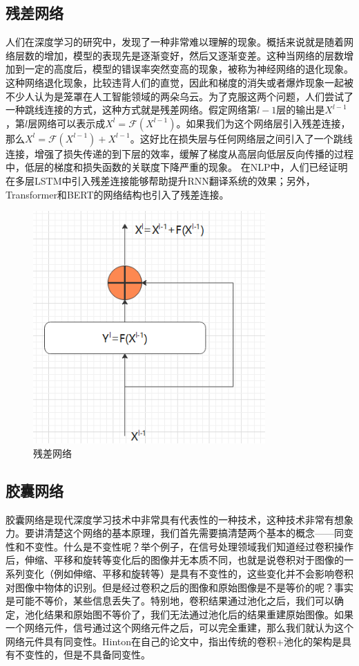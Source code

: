 \documentclass[twoside,a4paper,12pt]{book}%
\begin{document}
\subsection{残差网络}
人们在深度学习的研究中，发现了一种非常难以理解的现象。概括来说就是随着网络层数的增加，模型的表现先是逐渐变好，然后又逐渐变差。这种当网络的层数增加到一定的高度后，模型的错误率突然变高的现象，被称为神经网络的退化现象。这种网络退化现象，比较违背人们的直觉，因此和梯度的消失或者爆炸现象一起被不少人认为是笼罩在人工智能领域的两朵乌云。为了克服这两个问题，人们尝试了一种跳线连接的方式，这种方式就是残差网络。假定网络第$l-1$层的输出是$X^{l-1}$，第$l$层网络可以表示成$X^l=\mathcal{F}(X^{l-1})$。如果我们为这个网络层引入残差连接，那么$X^l=\mathcal{F}(X^{l-1})+X^{l-1}$。这好比在损失层与任何网络层之间引入了一个跳线连接，增强了损失传递的到下层的效率，缓解了梯度从高层向低层反向传播的过程中，低层的梯度和损失函数的关联度下降严重的现象。
在\gls{NLP}中，人们已经证明在多层\gls{LSTM}中引入残差连接能够帮助提升\gls{RNN}翻译系统的效果；另外，Transformer和\gls{BERT}的网络结构也引入了残差连接。
\begin{figure}[ht]
\begin{center}
\includegraphics[width=3.5in]{figures/resnet.png}
\caption{残差网络}
\label{fig:resnet}
\end{center}
\end{figure}

\subsection{胶囊网络}
胶囊网络是现代深度学习技术中非常具有代表性的一种技术，这种技术非常有想象力。要讲清楚这个网络的基本原理，我们首先需要搞清楚两个基本的概念——同变性和不变性。什么是不变性呢？举个例子，在信号处理领域我们知道经过卷积操作后，伸缩、平移和旋转等变化后的图像并无本质不同，也就是说卷积对于图像的一系列变化（例如伸缩、平移和旋转等）是具有不变性的，这些变化并不会影响卷积对图像中物体的识别。但是经过卷积之后的图像和原始图像是不是等价的呢？事实是可能不等价，某些信息丢失了。特别地，卷积结果通过池化之后，我们可以确定，池化结果和原始图不等价了，我们无法通过池化后的结果重建原始图像。如果一个网络元件，信号通过这个网络元件之后，可以完全重建，那么我们就认为这个网络元件具有同变性。Hinton在自己的论文中，指出传统的卷积+池化的架构是具有不变性的，但是不具备同变性。
\end{document}
